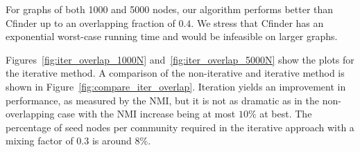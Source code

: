 For graphs of both 1000 and 5000 nodes, our algorithm performs better 
than Cfinder up to an overlapping fraction of $0.4$. We stress that Cfinder 
has an exponential worst-case running time and would be infeasible on larger graphs. 
%
%

Figures~\ref{fig:iter_overlap_1000N} and~\ref{fig:iter_overlap_5000N} show the 
plots for the iterative method. A comparison of the non-iterative and iterative method 
is shown in Figure~\ref{fig:compare_iter_overlap}. Iteration yields an improvement in performance,
as measured by the NMI, but it is not as dramatic as in the non-overlapping case 
with the NMI increase being at most $10\%$ at best. The percentage of seed nodes per community required in the iterative 
approach with a mixing factor of $0.3$ is around 8$\%$. 


